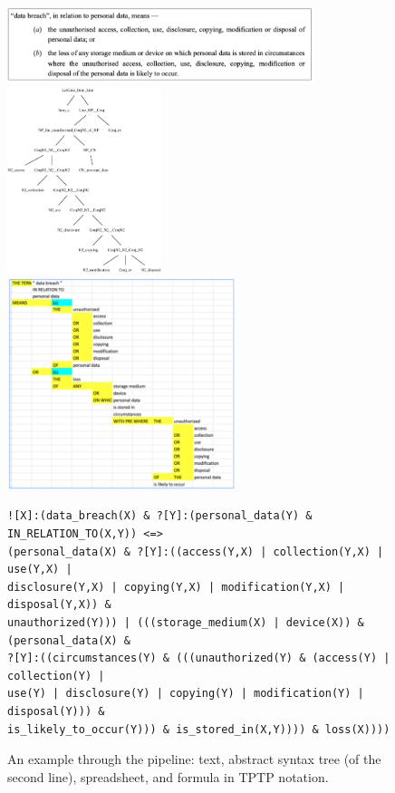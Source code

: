 \documentclass{IOS-Book-Article}
\begin{document}
\begin{figure}
\includegraphics[width=0.8\textwidth]{text.png}
\includegraphics[width=0.4\textwidth]{tree.eps}
\includegraphics[width=0.6\textwidth]{assembly.png}
\small
\begin{verbatim}
![X]:(data_breach(X) & ?[Y]:(personal_data(Y) & IN_RELATION_TO(X,Y)) <=>
(personal_data(X) & ?[Y]:((access(Y,X) | collection(Y,X) | use(Y,X) |
disclosure(Y,X) | copying(Y,X) | modification(Y,X) | disposal(Y,X)) &
unauthorized(Y))) | (((storage_medium(X) | device(X)) & (personal_data(X) &
?[Y]:((circumstances(Y) & (((unauthorized(Y) & (access(Y) | collection(Y) |
use(Y) | disclosure(Y) | copying(Y) | modification(Y) | disposal(Y))) &
is_likely_to_occur(Y))) & is_stored_in(X,Y)))) & loss(X))))
\end{verbatim}
\normalsize
\caption{An example through the pipeline: text, abstract syntax tree (of the second line), spreadsheet, and formula in TPTP notation.
}
\label{pipeline-ex}
\end{figure}
\end{document}
